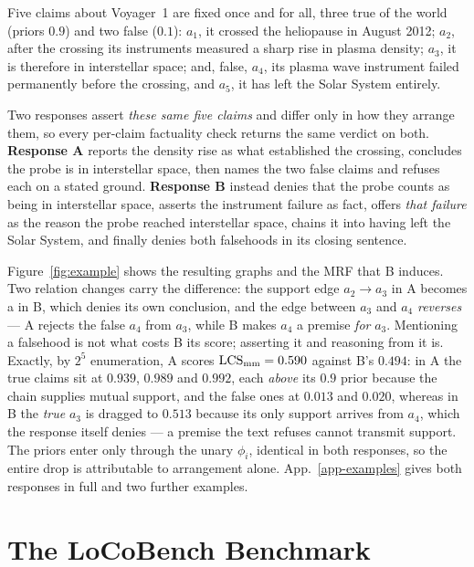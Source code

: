 

Five claims about Voyager~1 are fixed once and for all, three true of the world (priors $0.9$) and two false
($0.1$): $a_1$, it crossed the heliopause in August 2012; $a_2$, after the crossing its instruments measured
a sharp rise in plasma density; $a_3$, it is therefore in interstellar space; and, false, $a_4$, its plasma
wave instrument failed permanently before the crossing, and $a_5$, it has left the Solar System entirely.

Two responses assert \emph{these same five claims} and differ only in how they arrange them, so every per-claim
factuality check returns the same verdict on both. \textbf{Response A} reports the density rise as what
established the crossing, concludes the probe is in interstellar space, then names the two false claims and
refuses each on a stated ground. \textbf{Response B} instead denies that the probe counts as being in
interstellar space, asserts the instrument failure as fact, offers \emph{that failure} as the reason the probe
reached interstellar space, chains it into having left the Solar System, and finally denies both falsehoods in
its closing sentence.

Figure~\ref{fig:example} shows the resulting graphs and the MRF that B induces. Two relation changes carry the
difference: the support edge $a_2\!\to\!a_3$ in A becomes a \con{} in B, which denies its own conclusion, and
the edge between $a_3$ and $a_4$ \emph{reverses} --- A rejects the false $a_4$ from $a_3$, while B makes $a_4$ a
premise \emph{for} $a_3$. Mentioning a falsehood is not what costs B its score; asserting it and reasoning from
it is. Exactly, by $2^5$ enumeration, A scores $\mathrm{LCS}_{\mathrm{mm}}=0.590$ against B's $0.494$: in A the true claims sit
at $0.939$, $0.989$ and $0.992$, each \emph{above} its $0.9$ prior because the chain supplies mutual support,
and the false ones at $0.013$ and $0.020$, whereas in B the \emph{true} $a_3$ is dragged to $0.513$ because its
only support arrives from $a_4$, which the response itself denies --- a premise the text refuses cannot transmit
support. The priors enter only through the unary $\phi_i$, identical in both responses, so the entire drop is
attributable to arrangement alone. App.~\ref{app-examples} gives both responses in full and two further
examples.

\section{The LoCoBench Benchmark}
\label{sec-locobench}

